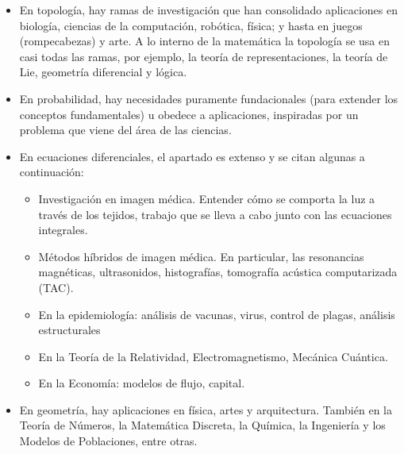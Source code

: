 \begin{itemize}
     \color{blue} \item \color{black} En topología, hay ramas de investigación que han consolidado aplicaciones en biología, ciencias de la computación, robótica, física; y hasta en juegos (rompecabezas) y arte. A lo interno de la matemática la topología se usa en casi todas las ramas, por ejemplo, la teoría de representaciones, la teoría de Lie, geometría diferencial y lógica. 
     
     \color{blue} \item \color{black} En probabilidad, hay necesidades puramente fundacionales (para extender los conceptos fundamentales) u obedece a aplicaciones, inspiradas por un problema que viene del área de las ciencias. 
     
     \color{blue} \item \color{black}  En ecuaciones diferenciales, el apartado es extenso y se citan algunas a continuación:
     
     \begin{itemize}
         
     
     \color{blue} \item \color{black} Investigación en imagen médica. Entender cómo se comporta la luz a través de los tejidos, trabajo que se lleva a cabo junto con las ecuaciones integrales. 
     
     \color{blue} \item \color{black} Métodos híbridos de imagen médica. En particular, las resonancias magnéticas, ultrasonidos, histografías, tomografía acústica computarizada (TAC).
     
     \color{blue} \item \color{black} En la epidemiología: análisis de vacunas, virus, control de plagas, análisis estructurales
     
     \color{blue} \item \color{black} En la Teoría de la Relatividad, Electromagnetismo, Mecánica Cuántica. 
     
     
      \color{blue} \item \color{black} En la Economía: modelos de flujo, capital.
      \end{itemize}
     
     \color{blue} \item \color{black} En geometría, hay aplicaciones en física, artes y arquitectura. También en la Teoría de Números, la Matemática Discreta, la Química, la Ingeniería y los Modelos de Poblaciones, entre otras.
     

\end{itemize}
